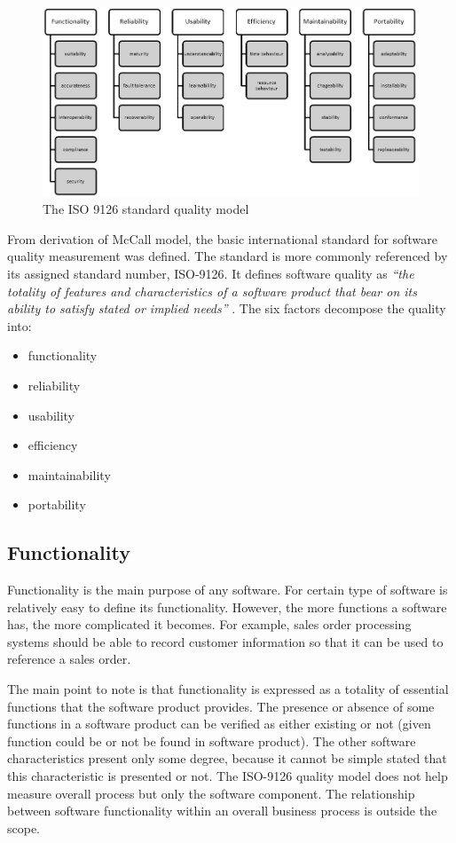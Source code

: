 \begin{figure}[h!]
	\centering
	\includegraphics[scale=0.6]{img/diag.png} 
	\caption{The ISO 9126 standard quality model}		
	\label{fig:iso9126}
\end{figure}

From derivation of McCall model, the basic international standard for software quality measurement was defined. The standard is more commonly referenced by its assigned standard number, ISO-9126. It defines software quality as\textit{ ``the totality of features and characteristics of a software product that bear on its ability to satisfy stated or implied needs''} \cite{ISO9126}. The six factors decompose the quality into: 

\begin{itemize}
  \item functionality 
  \item reliability
  \item usability
  \item efficiency
  \item maintainability
  \item portability   
  \end{itemize}
    
\subsection{Functionality}
Functionality is the main purpose of any software. For certain type of software is relatively easy to define its functionality. However, the more functions a software has, the more complicated it becomes. For example, sales order processing systems should be able to record customer information so that it can be used to reference a sales order.

The main point to note is that functionality is expressed as a totality of essential functions that the software product provides. The presence or absence of some functions in a software product can be verified as either existing or not (given function could be or not be found in software product). The other software characteristics present only some degree, because it cannot be simple stated that this characteristic is presented or not. The ISO-9126 quality model does not help measure overall process but only the software component. The relationship between software functionality within an overall business process is outside the scope.

